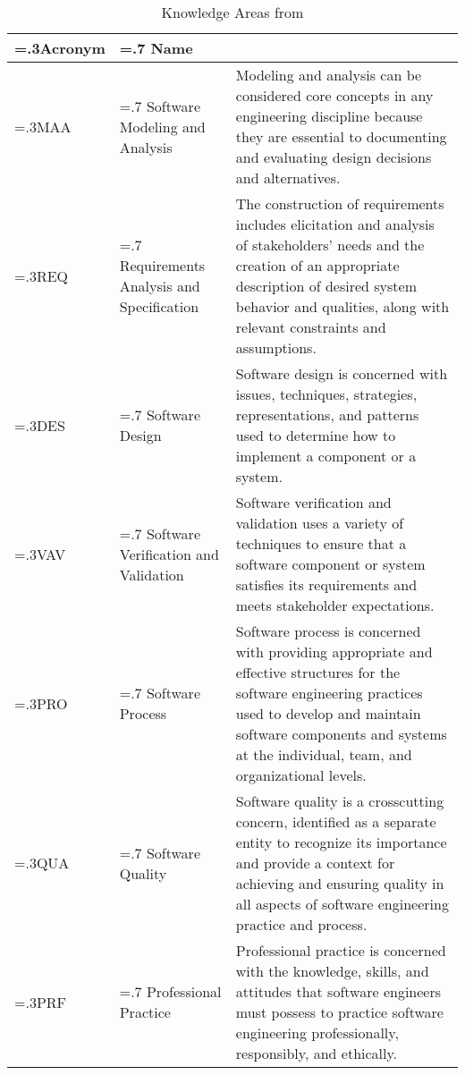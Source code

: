 
\begin{table}[htb]
\caption{Knowledge Areas from \cite{Acm:2015}}
\label{table:knowledgeareas}
\centering
\scriptsize
\begin{tabularx}{\textwidth}{>{\hsize=.3\hsize}X>{\hsize=.7\hsize}X>{\hsize=2\hsize}X}
\hline
\textbf{Acronym} & \textbf{Name} & \multicolumn{1}{c}{\textbf{Description}}  \\
\hline
MAA              & Software Modeling and Analysis          & Modeling and analysis can be considered core concepts in any engineering discipline because they are essential to documenting and evaluating design decisions and alternatives.                                                           \\
REQ              & Requirements Analysis and Specification & The construction of requirements includes elicitation and analysis of stakeholders’ needs and the creation of an appropriate description of desired system behavior and qualities, along with relevant constraints and assumptions.       \\
DES              & Software Design                         & Software design is concerned with issues, techniques, strategies, representations, and patterns used to determine how to implement a component or a system.                                                                               \\
VAV              & Software Verification and Validation    & Software verification and validation uses a variety of techniques to ensure that a software component or system satisfies its requirements and meets stakeholder expectations.                                                            \\
PRO              & Software Process                        & Software process is concerned with providing appropriate and effective structures for the software engineering practices used to develop and maintain software components and systems at the individual, team, and organizational levels. \\
QUA              & Software Quality                        & Software quality is a crosscutting concern, identified as a separate entity to recognize its importance and provide a context for achieving and ensuring quality in all aspects of software engineering practice and process.             \\
PRF              & Professional Practice                   & Professional practice is concerned with the knowledge, skills, and attitudes that software engineers must possess to practice software engineering professionally, responsibly, and ethically.                                            \\
\hline
\end{tabularx}
\end{table}
